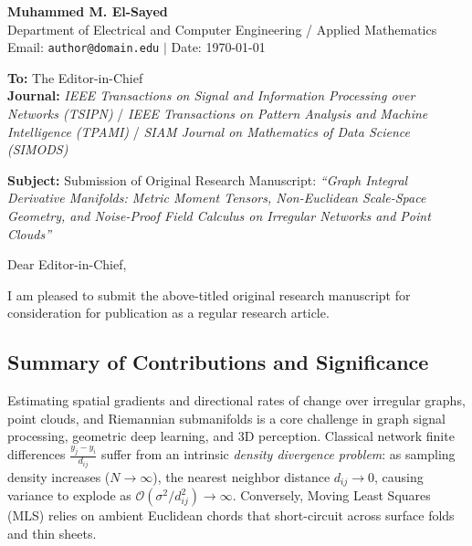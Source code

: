 \documentclass[11pt,a4paper]{article}
\begin{document}
\noindent
\textbf{Muhammed M. El-Sayed}\\
Department of Electrical and Computer Engineering / Applied Mathematics\\
Email: \texttt{author@domain.edu} \quad $|$ \quad Date: \today

\vspace{1.5em}

\noindent
\textbf{To:} The Editor-in-Chief\\
\textbf{Journal:} \emph{IEEE Transactions on Signal and Information Processing over Networks (TSIPN)} / \emph{IEEE Transactions on Pattern Analysis and Machine Intelligence (TPAMI)} / \emph{SIAM Journal on Mathematics of Data Science (SIMODS)}

\vspace{1.5em}

\noindent
\textbf{Subject:} Submission of Original Research Manuscript: \emph{``Graph Integral Derivative Manifolds: Metric Moment Tensors, Non-Euclidean Scale-Space Geometry, and Noise-Proof Field Calculus on Irregular Networks and Point Clouds''}

\vspace{1em}

\noindent
Dear Editor-in-Chief,

I am pleased to submit the above-titled original research manuscript for consideration for publication as a regular research article.

\subsection*{Summary of Contributions and Significance}
Estimating spatial gradients and directional rates of change over irregular graphs, point clouds, and Riemannian submanifolds is a core challenge in graph signal processing, geometric deep learning, and 3D perception. Classical network finite differences $\frac{y_j - y_i}{d_{ij}}$ suffer from an intrinsic \emph{density divergence problem}: as sampling density increases ($N \to \infty$), the nearest neighbor distance $d_{ij} \to 0$, causing variance to explode as $\mathcal{O}(\sigma^2 / d_{ij}^2) \to \infty$. Conversely, Moving Least Squares (MLS) relies on ambient Euclidean chords that short-circuit across surface folds and thin sheets.
\end{document}
